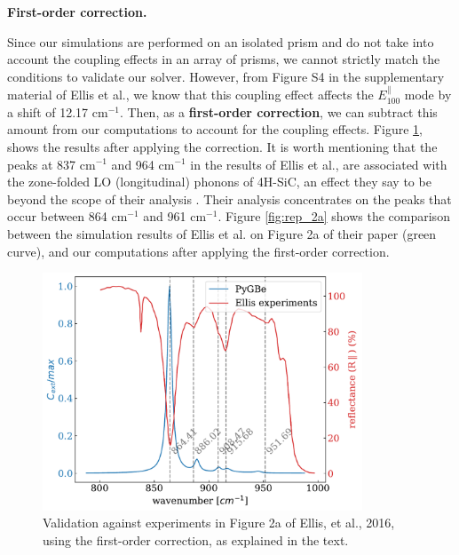 \textbf{First-order correction.} 

Since our simulations are performed on an isolated prism and do not take into account the coupling effects 
in an array of prisms, we cannot strictly match the conditions to validate our solver. However, from Figure S4 in the supplementary material of 
Ellis et al., we know that this coupling effect affects the $E^{\parallel}_{100}$ mode by a shift of 12.17 cm$^{-1}$. Then, as a 
\textbf{first-order correction}, we can subtract this amount from our computations to account for the coupling effects. Figure \ref{fig:val_2a}, 
shows the results after applying the correction. It is worth mentioning that the peaks at 837 cm$^{-1}$ and 964 cm$^{-1}$ in the results of Ellis et al., 
are associated with the zone-folded LO (longitudinal) phonons of 4H-SiC, an effect they say to be beyond the scope of their analysis \cite{ellis2016}. Their 
analysis concentrates on the peaks that occur between 864 cm$^{-1}$ and 961 cm$^{-1}$. 
Figure \ref{fig:rep_2a} shows the comparison between the simulation results of Ellis et al. on Figure 2a of their paper (green curve), and our computations
after applying the first-order correction.

\begin{figure}
    \centering
    \includegraphics[width=0.85\textwidth]{validation_FOA_fig2a_Ellis.pdf} 
    \caption{Validation against experiments in Figure 2a of Ellis, et al., 2016, using the first-order correction, as explained in the text.}
    \label{fig:val_2a}
 \end{figure}

